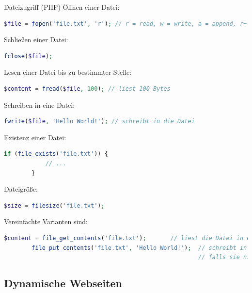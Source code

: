 \begin{bonus}{Dateizugriff (PHP)}
    Öffnen einer Datei:
    \begin{lstlisting}[language=php]
        $file = fopen('file.txt', 'r'); // r = read, w = write, a = append, r+ = read/write
    \end{lstlisting}

    Schließen einer Datei:
    \begin{lstlisting}[language=php]
        fclose($file);
    \end{lstlisting}

    Lesen einer Datei bis zu bestimmter Stelle:
    \begin{lstlisting}[language=php]
        $content = fread($file, 100); // liest 100 Bytes
    \end{lstlisting}

    Schreiben in eine Datei:
    \begin{lstlisting}[language=php]
        fwrite($file, 'Hello World!'); // schreibt in die Datei
    \end{lstlisting}

    Existenz einer Datei:
    \begin{lstlisting}[language=php]
        if (file_exists('file.txt')) {
            // ...
        }
    \end{lstlisting}

    Dateigröße:
    \begin{lstlisting}[language=php]
        $size = filesize('file.txt');
    \end{lstlisting}

    Vereinfachte Varianten sind:
    \begin{lstlisting}[language=php]
        $content = file_get_contents('file.txt');       // liest die Datei in einen String
        file_put_contents('file.txt', 'Hello World!');  // schreibt in die Datei,
                                                        // falls sie nicht existiert wird sie erstellt
    \end{lstlisting}

\end{bonus}

\subsection{Dynamische Webseiten}

